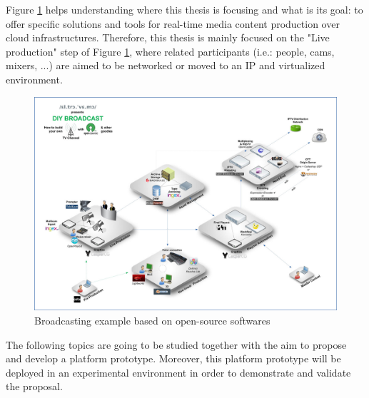 Figure \ref{F:bebooss} helps understanding where this thesis is focusing and what is its goal:  to offer specific solutions and tools for real-time media content production over cloud infrastructures. Therefore, this thesis is mainly focused on the "Live production" step of Figure \ref{F:bebooss}, where related participants (i.e.: people, cams, mixers, ...) are aimed to be networked or moved to an IP and virtualized environment. 

\begin{figure}[!htb]
\begin{center}
\includegraphics[width=1\textwidth]{./images/DIY_broadcast_platform_exportweb.jpg}
\caption{Broadcasting example based on open-source softwares \cite{bexample}}
\label{F:bebooss}
\end{center}
\end{figure}

The following topics are going to be studied together with the aim to propose and develop a platform prototype. Moreover, this platform prototype will be deployed in an experimental environment in order to demonstrate and validate the proposal. 

